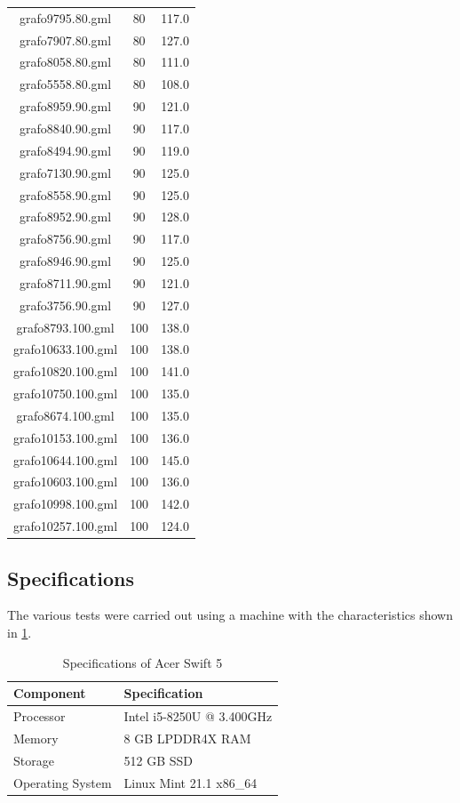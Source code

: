 \documentclass[bachelor, english]{algothesis}
\begin{document}
\begin{minipage}{0.5\textwidth}
\tablefirsthead{}

\begin{xtabular}{|c|c|c|}
grafo9795.80.gml & 80 & 117.0 \\
grafo7907.80.gml & 80 & 127.0 \\
grafo8058.80.gml & 80 & 111.0 \\
grafo5558.80.gml & 80 & 108.0 \\
\hline
grafo8959.90.gml & 90 & 121.0 \\
grafo8840.90.gml & 90 & 117.0 \\
grafo8494.90.gml & 90 & 119.0 \\
grafo7130.90.gml & 90 & 125.0 \\
grafo8558.90.gml & 90 & 125.0 \\
grafo8952.90.gml & 90 & 128.0 \\
grafo8756.90.gml & 90 & 117.0 \\
grafo8946.90.gml & 90 & 125.0 \\
grafo8711.90.gml & 90 & 121.0 \\
grafo3756.90.gml & 90 & 127.0 \\
\hline
grafo8793.100.gml & 100 & 138.0 \\
grafo10633.100.gml & 100 & 138.0 \\
grafo10820.100.gml & 100 & 141.0 \\
grafo10750.100.gml & 100 & 135.0 \\
grafo8674.100.gml & 100 & 135.0 \\
grafo10153.100.gml & 100 & 136.0 \\
grafo10644.100.gml & 100 & 145.0 \\
grafo10603.100.gml & 100 & 136.0 \\
grafo10998.100.gml & 100 & 142.0 \\
grafo10257.100.gml & 100 & 124.0 \\
\hline
\end{xtabular}
\end{minipage}

\subsection{Specifications}
The various tests were carried out using a machine with the characteristics shown in \cref{tab:specs}.

\begin{table}[h]
\centering
\begin{tabular}{|l|l|}
\hline
\textbf{Component}      & \textbf{Specification}                \\ \hline
Processor       & Intel i5-8250U @ 3.400GHz      \\ \hline
Memory          & 8 GB LPDDR4X RAM               \\ \hline
Storage         & 512 GB SSD                     \\ \hline
Operating System & Linux Mint 21.1 x86\_64        \\ \hline
\end{tabular}
\caption{Specifications of Acer Swift 5}
\label{tab:specs}
\end{table}
\end{document}
